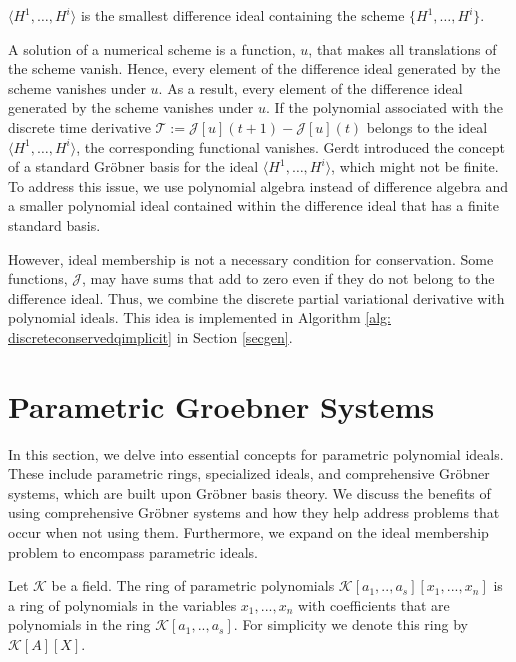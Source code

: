 \documentclass[runningheads]{llncs}
\newcommand{\1}{\chi}
\begin{document}
\begin{definition}
	$\langle H^1,\ldots,H^i\rangle$ is the smallest difference ideal containing the scheme $\{H^1,\ldots,H^i\}$.
\end{definition}


A solution of a numerical scheme is a function, $u$, that makes all translations of the scheme vanish. Hence, every element of the difference ideal generated by the scheme vanishes under $u$. As a result, every element of the difference ideal generated by the scheme vanishes under $u$. If the polynomial associated with the discrete time derivative  $\mathcal{T}:=\mathcal{J}[u](t+1)-\mathcal{J}[u](t)$
belongs to the ideal $\langle H^1,\ldots,H^i\rangle$, the corresponding functional vanishes. 
 Gerdt introduced the concept of a standard  Gr{\"o}bner basis for the ideal $\langle H^1,\ldots,H^i\rangle$, which might not be finite. To address this issue, we use polynomial algebra instead of difference algebra and a smaller polynomial ideal contained within the difference ideal that has a finite standard basis.
 
 However, ideal membership is not  a necessary condition for conservation. Some functions, $\mathcal{J}$,
 may have sums that add to zero even if they do not belong to the difference ideal. Thus, we combine the discrete partial variational derivative with polynomial ideals. This idea is implemented in Algorithm \ref{alg: discreteconservedqimplicit} in Section \ref{secgen}.












 \newpage 
\section{Parametric Groebner Systems}
\label{pgs}

In this section, we delve into essential concepts for 
parametric polynomial ideals. These include parametric rings, 
specialized ideals, and comprehensive Gr{\"o}bner systems, which are built upon 
Gr{\"o}bner basis theory. 
We discuss the benefits of using comprehensive Gr{\"o}bner systems 
and how they help address problems that occur when not using them. 
Furthermore, we expand on the ideal membership problem to encompass parametric ideals.



\begin{definition}
    Let $\mathcal{K}$ be a field. The ring of parametric polynomials
    $\mathcal{K}[a_1,..,a_s][x_1,...,x_n]$ is a ring of polynomials in the variables $x_1,...,x_n$ with coefficients that are polynomials
    in the ring $\mathcal{K}[a_1,..,a_s]$. 
    For simplicity we denote this ring by $\mathcal{K}[A][X]$.
\end{definition}
\end{document}
